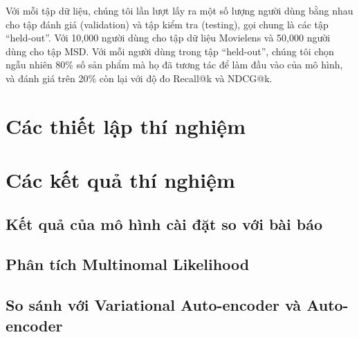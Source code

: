 Với mỗi tập dữ liệu, chúng tôi lần lượt lấy ra một số lượng người dùng bằng nhau cho tập đánh giá (validation) và tập kiểm tra (testing), gọi chung là các tập ``held-out''.
Với 10,000 người dùng cho tập dữ liệu Movielens và 50,000 người dùng cho tập MSD.
Với mỗi người dùng trong tập ``held-out'', chúng tôi chọn ngẫu nhiên 80\% số sản phẩm mà họ đã tương tác để làm đầu vào của mô hình, và đánh giá trên 20\% còn lại với 
độ đo Recall@k và NDCG@k.


\section{Các thiết lập thí nghiệm}
\section{Các kết quả thí nghiệm}
    \subsection{Kết quả của mô hình cài đặt so với bài báo}
    \subsection{Phân tích Multinomal Likelihood}
    \subsection{So sánh với Variational Auto-encoder và Auto-encoder}
